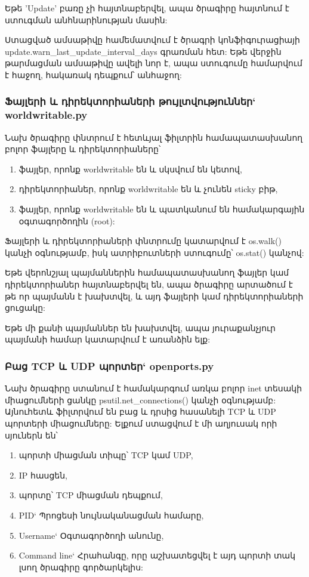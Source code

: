\documentclass[a4paper,12pt]{article}
\begin{document}
\begin{sloppypar}
\begin{itemize}
	Եթե 'Update' բառը չի հայտնաբերվել, ապա ծրագիրը հայտնում է ստուգման անհնարինության մասին:
\end{itemize}

Ստացված ամսաթիվը համեմատվում է ծրագրի կոնֆիգուրացիայի
update.warn\_last\_update\_interval\_days
գրառման հետ: Եթե վերջին թարմացման ամսաթիվը ավելի նոր է,
ապա ստուգումը համարվում է հաջող, հակառակ դեպքում՝ անհաջող:


\subsubsection{Ֆայլերի և դիրեկտորիաների թույլտվություններ` worldwritable.py}


Նախ ծրագիրը փնտրում է հետևյալ ֆիլտրին համապատասխանող բոլոր ֆայլերը և դիրեկտորիաները՝

\begin{enumerate}
\item ֆայլեր, որոնք worldwritable են և սկսվում են կետով,
\item դիրեկտորիաներ, որոնք worldwritable են և չունեն sticky բիթ,
\item ֆայլեր, որոնք worldwritable են և պատկանում են համակարգային օգտագործողին (root):
\end{enumerate}

Ֆայլերի և դիրեկտորիաների փնտրումը կատարվում է os.walk() կանչի օգնությամբ,
իսկ ատրիբուտների ստուգումը՝ os.stat() կանչով:

Եթե վերոնշյալ պայմաններին համապատասխանող ֆայլեր կամ դիրեկտորիաներ հայտնաբերվել են,
ապա ծրագիրը արտածում է թե որ պայմանն է խախտվել, և այդ ֆայլերի կամ դիրեկտորիաների
ցուցակը:

Եթե մի քանի պայմաններ են խախտվել, ապա յուրաքանչյուր պայմանի համար կատարվում է
առանձին ելք:


\subsubsection{Բաց TCP և UDP պորտեր` openports.py}


Նախ ծրագիրը ստանում է համակարգում առկա բոլոր inet տեսակի միացումների ցանկը
psutil.net\_connections() կանչի օգնությամբ:
Այնուհետև ֆիլտրվում են բաց և դրսից հասանելի TCP և UDP պորտերի միացումները:
Ելքում ստացվում է մի աղյուսակ որի սյուներն են՝

\begin{enumerate}
\item պորտի միացման տիպը՝ TCP կամ UDP,
\item IP հասցեն,
\item պորտը՝ TCP միացման դեպքում,
\item PID` Պրոցեսի նույնականացման համարը,
\item Username` Օգտագործողի անունը,
\item Command line` Հրահանգը, որը աշխատեցվել է այդ պորտի տակ լսող ծրագիրը գործարկելիս:
\end{enumerate}



\end{sloppypar}
\end{document}
